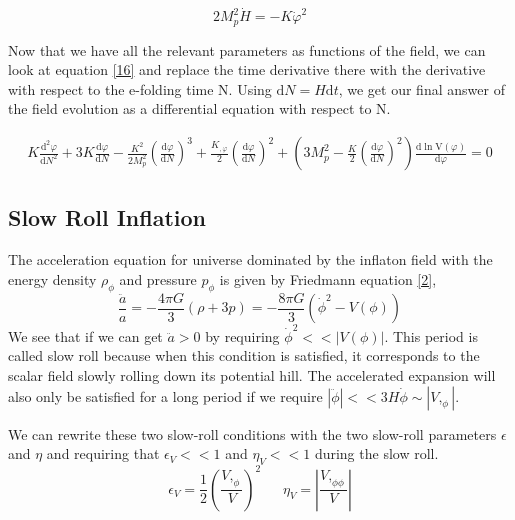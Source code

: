 \documentclass[aps,prd,reprint,preprintnumbers,showpacs,floatfix,nofootinbib,superscript address]{revtex4-2}
\begin{document}
\begin{equation}
    2 M_p^2 \dot{H} = -  K \dot{\varphi}^2
\end{equation}

Now that we have all the relevant parameters as functions of the field, we can look at equation \ref{16} and replace the time derivative there with the derivative with respect to the e-folding time N. Using $\text{d}N = H \text{d}t$, we get our final answer of the field evolution as a differential equation with respect to N.

\begin{widetext}
\begin{subequations}
\begin{align}\label{21}
    K\frac{\text{d}^2\varphi}{\text{d}N^2} +3 K \frac{\text{d}\varphi}{\text{d}N}  - \frac{K^2}{2M_p^2} \left(\frac{\text{d}\varphi}{\text{d}N} \right)^3  +  \frac{K_{,\varphi}}{2}  \left(\frac{\text{d}\varphi}{\text{d}N} \right)^2 +  \left( 3 M_p^2 - \frac{K}{2} \left(\frac{\text{d}\varphi}{\text{d}N} \right)^2 \right) \frac{\text{d}\ln \text{V}(\varphi)}{\text{d} \varphi} = 0    
\end{align}
\end{subequations}
\end{widetext}

\subsection{Slow Roll Inflation}
The acceleration equation for universe dominated by the inflaton field with the energy density $\rho_{\phi}$ and pressure $p_{\phi}$ is given by Friedmann equation \ref{2},
\begin{equation}
    \frac{\ddot{a}}{a} = -\frac{4\pi G}{3} (\rho +3p) = -\frac{8\pi G}{3} ({\dot{\phi}}^2 - V(\phi)) 
\end{equation}
We see that if we can get $\ddot{a} > 0$ by requiring $\dot{\phi}^2 << |V(\phi)|$. This period is called slow roll because when this condition is satisfied, it corresponds to the scalar field slowly rolling down its potential hill. The accelerated expansion will also only be satisfied for a long period if we require $|\ddot{\phi}| << 3H\dot{\phi} \sim |V,_{\phi}|$. 

We can rewrite these two slow-roll conditions with the two slow-roll parameters $\epsilon$ and $\eta$ and requiring that $\epsilon_V << 1$ and $\eta_V << 1$ during the slow roll. 
\begin{equation}
    \epsilon_V = \frac{1}{2}  \left( \frac{V,_{\phi}}{V} \right)^2 \,\,\,\,\,\,\,\,\ \eta_V = \left| \frac{V,_{\phi\phi}}{V} \right|
\end{equation}
\end{document}
